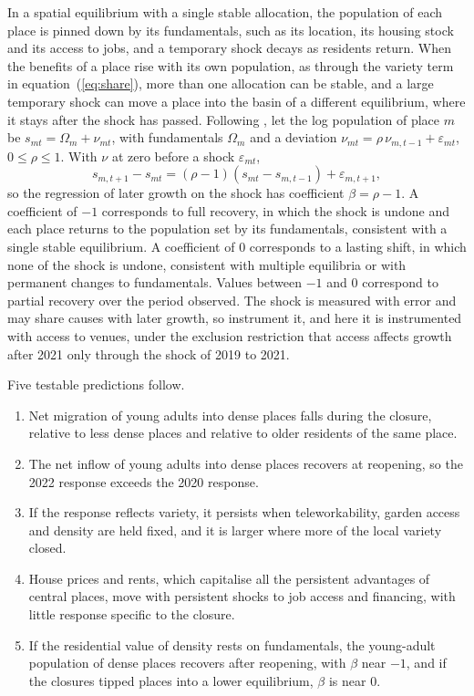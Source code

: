 \documentclass[11pt,a4paper]{article}
\begin{document}
In a spatial equilibrium with a single stable allocation, the population of each place is pinned down by its fundamentals, such as its location, its housing stock and its access to jobs, and a temporary shock decays as residents return. When the benefits of a place rise with its own population, as through the variety term in equation~(\ref{eq:share}), more than one allocation can be stable, and a large temporary shock can move a place into the basin of a different equilibrium, where it stays after the shock has passed. Following \citet{davis2002}, let the log population of place $m$ be $s_{mt} = \Omega_m + \nu_{mt}$, with fundamentals $\Omega_m$ and a deviation $\nu_{mt} = \rho\, \nu_{m,t-1} + \varepsilon_{mt}$, $0 \le \rho \le 1$. With $\nu$ at zero before a shock $\varepsilon_{mt}$,
\begin{equation}\label{eq:dw}
s_{m,t+1} - s_{mt} = (\rho - 1)(s_{mt} - s_{m,t-1}) + \varepsilon_{m,t+1},
\end{equation}
so the regression of later growth on the shock has coefficient $\beta = \rho - 1$. A coefficient of $-1$ corresponds to full recovery, in which the shock is undone and each place returns to the population set by its fundamentals, consistent with a single stable equilibrium. A coefficient of $0$ corresponds to a lasting shift, in which none of the shock is undone, consistent with multiple equilibria or with permanent changes to fundamentals. Values between $-1$ and $0$ correspond to partial recovery over the period observed. The shock is measured with error and may share causes with later growth, so \citet{davis2002} instrument it, and here it is instrumented with access to venues, under the exclusion restriction that access affects growth after 2021 only through the shock of 2019 to 2021.

Five testable predictions follow.
\begin{enumerate}
\item Net migration of young adults into dense places falls during the closure, relative to less dense places and relative to older residents of the same place.
\item The net inflow of young adults into dense places recovers at reopening, so the 2022 response exceeds the 2020 response.
\item If the response reflects variety, it persists when teleworkability, garden access and density are held fixed, and it is larger where more of the local variety closed.
\item House prices and rents, which capitalise all the persistent advantages of central places, move with persistent shocks to job access and financing, with little response specific to the closure.
\item If the residential value of density rests on fundamentals, the young-adult population of dense places recovers after reopening, with $\beta$ near $-1$, and if the closures tipped places into a lower equilibrium, $\beta$ is near $0$.
\end{enumerate}
\end{document}
